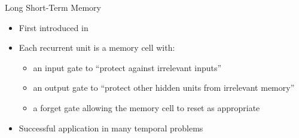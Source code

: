 \documentclass[12pt]{beamer}
\begin{document}
\begin{frame}{Long Short-Term Memory}
    \begin{alertblock}{}
        \begin{itemize}
            \item First introduced in \cite{Hochreiter:1997:LSM:1246443.1246450}
            \item Each recurrent unit is a memory cell with:
            \begin{itemize}
                \item an input gate to ``protect against irrelevant inputs'' \cite{Hochreiter:1997:LSM:1246443.1246450}
                \item an output gate to ``protect other hidden units from irrelevant memory'' \cite{Hochreiter:1997:LSM:1246443.1246450}
                \item a forget gate allowing the memory cell to reset as appropriate \cite{Gers:2000:LFC:1121912.1121915}
            \end{itemize}
            \item Successful application in many temporal problems \cite{DBLP:journals/corr/Graves13,conf/icml/JozefowiczZS15}
        \end{itemize}
    \end{alertblock}
\end{frame}
\end{document}
